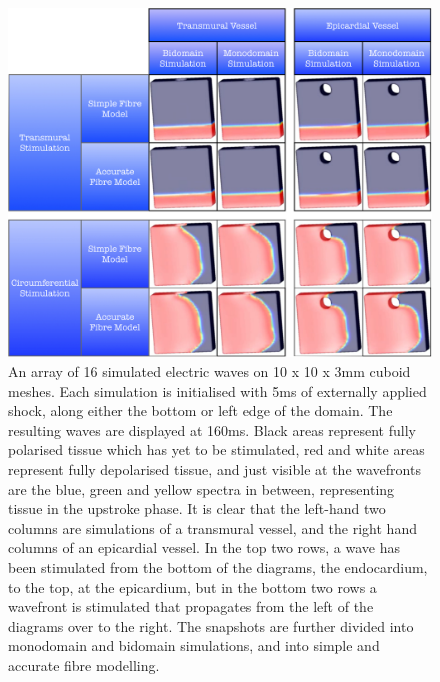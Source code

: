     \begin{figure}[htbp]
  		\centering
  	    \includegraphics[width=1\textwidth]{Ch5/Figs/planar_propagation_1}
              \caption{An array of 16 simulated electric waves on 10 x 10 x 3mm cuboid meshes. Each simulation is initialised with 5ms of externally applied shock, along either the bottom or left edge of the domain. The resulting waves are displayed at 160ms. Black areas represent fully polarised tissue which has yet to be stimulated, red and white areas represent fully depolarised tissue, and just visible at the wavefronts are the blue, green and yellow spectra in between, representing tissue in the upstroke phase. It is clear that the left-hand two columns are simulations of a transmural vessel, and the right hand columns of an epicardial vessel. In the top two rows, a wave has been stimulated from the bottom of the diagrams, the endocardium, to the top, at the epicardium, but in the bottom two rows a wavefront is stimulated that propagates from the left of the diagrams over to the right. The snapshots are further divided into monodomain and bidomain simulations, and into simple and accurate fibre modelling.}
  	  \label{fig:planar_propagation_1}
  	\end{figure}
    
